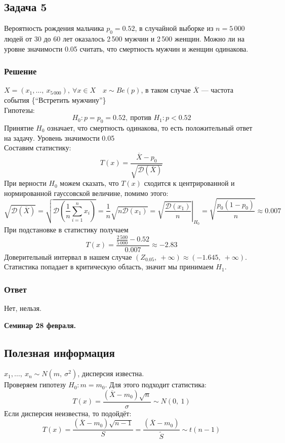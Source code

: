 \documentclass[12pt, a4paper]{article}
\newcommand{\dev}{\mathcal{D}}
\begin{document}
\subsection*{Задача 5}
Вероятность рождения мальчика $p_0 = 0.52$, в случайной выборке из $n = 5\,000$ людей от 30 до 60 лет оказалось 2\,500 мужчин и 2\,500 женщин. Можно ли на уровне значимости 0.05 считать, что смертность мужчин и женщин одинакова.
\subsubsection*{Решение}
$X = (x_1,\dots,\ x_{5\,000}),\ \forall x\in X\quad x\sim Be(p)$, в таком случае $\overline{X}$ --- частота события \{``Встретить мужчину''\}\\
Гипотезы:
\[H_0: p = p_0 = 0.52,\ \text{против } H_1: p < 0.52\]
Принятие $H_0$ означает, что смертность одинакова, то есть положительный ответ на задачу.
Уровень значимости 0.05\\
Составим статистику:
\[T(x) = \frac{\overline{X} - p_0}{\sqrt{\dev\left( \overline{X} \right)}}\]
При верности $H_0$ можем сказать, что $T(x)$ сходится к центрированной и нормированной гауссовской величине, помимо этого:
\[\sqrt{\dev(\overline{X})} = \sqrt{\dev\left( \frac{1}{n}\sum_{i = 1}^{n}x_i \right)} = \frac{1}{n} \sqrt{n\dev(x_1)} = \left.\sqrt{\frac{\dev(x_1)}{n}}\right|_{H_0} = \sqrt{\frac{p_0 (1 - p_0)}{n}} \approx 0.007\]
При подстановке в статистику получаем
\[T(x) = \frac{\frac{2\,500}{5\,000} - 0.52}{0.007} \approx -2.83\]
Доверительный интервал в нашем случае $(Z_{0.05},\ +\infty) \approx (-1.645,\ +\infty)$. Статистика попадает в критическую область, значит мы принимаем $H_1$.
\subsubsection*{Ответ}
Нет, нельзя.
\begin{center}
    \bf Семинар 28 февраля.
\end{center}
\subsection*{Полезная информация}
$x_1,\dots,\ x_n \sim N(m,\ \sigma^2)$, дисперсия известна.\\
Проверяем гипотезу $H_0: m = m_0$. Для этого подходит статистика:
\[T(x) = \frac{(\overline{X} - m_0)\sqrt{n}}{\sigma} \sim N(0,\ 1)\]
Если дисперсия неизвестна, то подойдёт:
\[ T(x) = \frac{(\overline{X} - m_0) \sqrt{n - 1}}{S} = \frac{(\overline{X} - m_0)}{\tilde S} \sim t(n - 1)\]
\end{document}

